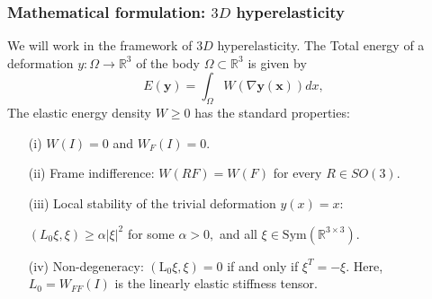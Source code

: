 \documentclass{beamer}
\begin{document}
    \begin{frame}
        \frametitle{Mathematical formulation: $3D$ hyperelasticity}
            
            We will work in the framework of $3D$ hyperelasticity. The Total energy of a deformation 
            {\color{violet}$y\colon \Omega\to\mathbb R^3$} of the body {\color{violet}$\Omega\subset\mathbb R^3$} is given by 
            {\color{violet}
            $$E(\boldsymbol{y})=\int_{\Omega} W(\nabla \boldsymbol{y(x)}) d x,
            $$
            }
            \pause
            The elastic energy density {\color{violet}$W\geq 0$} has the standard properties:
            \begin{itemize}
            \item[(i)] {\color{violet} $W(I)=0$} and {\color{violet} $W_F(I)=0$}. 
            
            \item[(ii)] Frame indifference: {\color{violet} $W(RF)=W(F)$} for every {\color{violet}$R\in SO(3).$}
            
            \item[(iii)] Local stability of the trivial deformation {\color{violet}$y(x)=x:$}\\
            \vspace{0.3cm}
            
            {\color{violet} $(L_0\xi,\xi)\geq \alpha|\xi|^2$} for some {\color{violet}$\alpha>0,$} and all {\color{violet}$\xi\in\mathrm{Sym}(\mathbb R^{3\times 3}).$}\\
            \item[(iv)] Non-degeneracy: {\color{violet}$\left(\mathrm{L}_{0} \xi,\xi\right)=0$} if and only if {\color{violet}$\xi^{T}=-\xi$}. 
            \vspace{0.3cm}
            Here, {\color{violet}$L_0=W_{FF}(I)$} is the linearly elastic stiffness tensor. 
            \end{itemize}
        \end{frame}
\end{document}
